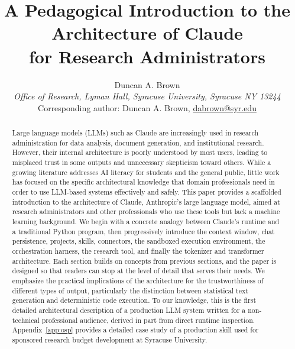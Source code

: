 \documentclass[12pt]{article}
\begin{document}
\title{A Pedagogical Introduction to the Architecture of Claude\\for Research Administrators}

\author{Duncan A. Brown\\[6pt]
\textit{Office of Research, Lyman Hall, Syracuse University, Syracuse NY 13244}\\[4pt]
Corresponding author: Duncan A. Brown, \href{mailto:dabrown@syr.edu}{dabrown@syr.edu}}

\date{}

\maketitle
\begin{abstract}
Large language models (LLMs) such as Claude are increasingly used in research administration for data analysis, document generation, and institutional research. However, their internal architecture is poorly understood by most users, leading to misplaced trust in some outputs and unnecessary skepticism toward others. While a growing literature addresses AI literacy for students and the general public, little work has focused on the specific architectural knowledge that domain professionals need in order to use LLM-based systems effectively and safely. This paper provides a scaffolded introduction to the architecture of Claude, Anthropic's large language model, aimed at research administrators and other professionals who use these tools but lack a machine learning background. We begin with a concrete analogy between Claude's runtime and a traditional Python program, then progressively introduce the context window, chat persistence, projects, skills, connectors, the sandboxed execution environment, the orchestration harness, the research tool, and finally the tokenizer and transformer architecture. Each section builds on concepts from previous sections, and the paper is designed so that readers can stop at the level of detail that serves their needs. We emphasize the practical implications of the architecture for the trustworthiness of different types of output, particularly the distinction between statistical text generation and deterministic code execution. To our knowledge, this is the first detailed architectural description of a production LLM system written for a non-technical professional audience, derived in part from direct runtime inspection. Appendix~\ref{app:osp} provides a detailed case study of a production skill used for sponsored research budget development at Syracuse University.
\end{abstract}
\end{document}
